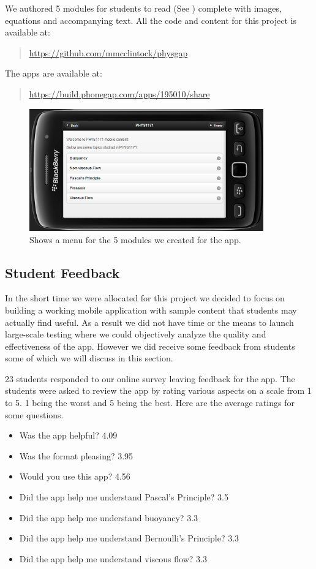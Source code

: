 \documentclass[12pt,a4paper]{article}  %
\begin{document}
We authored 5 modules for students to read (See ) complete with images, equations and accompanying text. All the code and content for this project is available at:
\begin{quote}\url{https://github.com/mmcclintock/physgap}\end{quote}
The apps are available at:
\begin{quote}\url{https://build.phonegap.com/apps/195010/share}\end{quote}

\begin{figure}[htb]
\centering
\includegraphics[width=0.9\textwidth]{menu.png}
\caption{Shows a menu for the 5 modules we created for the app.}
\label{fig:menu}
\end{figure}

\subsection{Student Feedback}

In the short time we were allocated for this project we decided to focus on building a working mobile application with sample content that students may actually find useful. As a result we did not have time or the means to launch large-scale testing where we could objectively analyze the quality and effectiveness of the app. However we did receive some feedback from students some of which we will discuss in this section.

23 students responded to our online survey leaving feedback for the app. The students were asked to review the app by rating various aspects on a scale from 1 to 5. 1 being the worst and 5 being the best. Here are the average ratings for some questions.

\begin{itemize}
\item Was the app helpful? 4.09
\item Was the format pleasing? 3.95
\item Would you use this app? 4.56
\item Did the app help me understand Pascal's Principle? 3.5 
\item Did the app help me understand buoyancy? 3.3
\item Did the app help me understand Bernoulli's Principle? 3.3
\item Did the app help me understand viscous flow? 3.3
\end{itemize}
\end{document}
